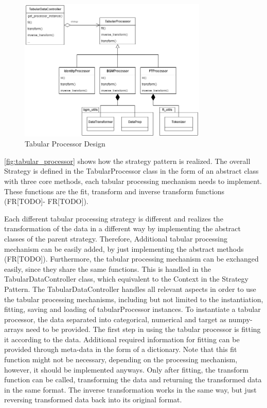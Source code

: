 \begin{figure}[h]
	\centering
	\includegraphics[width=0.8\textwidth]{images/tabular_processor.png}
	\caption{Tabular Processor Design}
	\label{fig:tabular_processor}
\end{figure}

\autoref{fig:tabular_processor} shows how the strategy pattern is realized.
The overall Strategy is defined in the TabularProcessor class in the form of an abstract class with three core methods, each tabular processing mechanism needs to implement.
These functions are the fit, transform and inverse transform functions (FR[TODO]- FR[TODO]).

Each different tabular processing strategy is different and realizes the transformation of the data in a different way by implementing the abstract classes of the parent strategy.
Therefore, Additional tabular processing mechanism can be easily added, by just implementing the abstract methods (FR[TODO]).
Furthermore, the tabular processing mechanism can be exchanged easily, since they share the same functions.
This is handled in the TabularDataController class, which equivalent to the Context in the Strategy Pattern.
The TabularDataController handles all relevant aspects in order to use the tabular processing mechanisms, including but not limited to the instantiation, fitting, saving and loading of tabularProcessor instances.
To instantiate a tabular processor, the data separated into categorical, numerical and target as numpy-arrays \cite{harris2020array} need to be provided.
The first step in using the tabular processor is fitting it according to the data.
Additional required information for fitting can be provided through meta-data in the form of a dictionary.
Note that this fit function might not be necessary, depending on the processing mechanism, however, it should be implemented anyways.
Only after fitting, the transform function can be called, transforming the data and returning the transformed data in the same format.
The inverse transformation works in the same way, but just reversing transformed data back into its original format.


